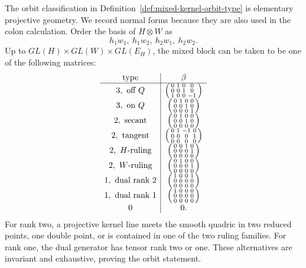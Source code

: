 The orbit classification in
Definition~\ref{def:mixed-kernel-orbit-type} is elementary projective
geometry.  We record normal forms because they are also used in the
colon calculation.  Order the basis of \(H\otimes W\) as
\[
 h_1w_1,\ h_1w_2,\ h_2w_1,\ h_2w_2.
\]
Up to \(GL(H)\times GL(W)\times GL(E_H)\), the mixed block can be
taken to be one of the following matrices:
\begin{equation}\label{eq:beta-normal-forms}
\begin{array}{c|c}
\text{type}&\beta\\ \hline
3,\ \text{off }Q&
\begin{psmallmatrix}0&1&0&0\\0&0&1&0\\1&0&0&-1\end{psmallmatrix}\\[3pt]
3,\ \text{on }Q&
\begin{psmallmatrix}0&1&0&0\\0&0&1&0\\0&0&0&1\end{psmallmatrix}\\[3pt]
2,\ \text{secant}&
\begin{psmallmatrix}0&1&0&0\\0&0&1&0\\0&0&0&0\end{psmallmatrix}\\[3pt]
2,\ \text{tangent}&
\begin{psmallmatrix}0&1&-1&0\\0&0&0&1\\0&0&0&0\end{psmallmatrix}\\[3pt]
2,\ H\text{-ruling}&
\begin{psmallmatrix}0&0&1&0\\0&0&0&1\\0&0&0&0\end{psmallmatrix}\\[3pt]
2,\ W\text{-ruling}&
\begin{psmallmatrix}0&1&0&0\\0&0&0&1\\0&0&0&0\end{psmallmatrix}\\[3pt]
1,\ \text{dual rank }2&
\begin{psmallmatrix}1&0&0&1\\0&0&0&0\\0&0&0&0\end{psmallmatrix}\\[3pt]
1,\ \text{dual rank }1&
\begin{psmallmatrix}1&0&0&0\\0&0&0&0\\0&0&0&0\end{psmallmatrix}\\[3pt]
0&0.
\end{array}
\end{equation}
For rank two, a projective kernel line meets the smooth quadric in
two reduced points, one double point, or is contained in one of the
two ruling families.  For rank one, the dual generator has tensor
rank two or one.  These alternatives are invariant and exhaustive,
proving the orbit statement.

